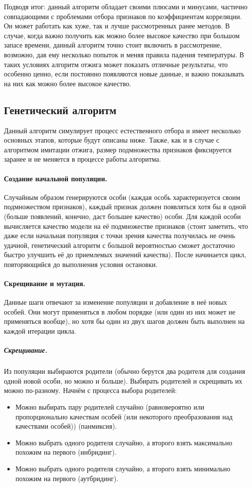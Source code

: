 \documentclass[12pt,fleqn]{article}
\begin{document}
	Подводя итог: данный алгоритм обладает своими плюсами и минусами, частично совпадающими с проблемами отбора признаков по коэффициентам корреляции. Он может работать как хуже, так и лучше рассмотренных ранее методов. В случае, когда важно получить как можно более высокое качество при большом запасе времени, данный алгоритм точно стоит включить в рассмотрение, возможно, дав ему несколько попыток и меняя правила падения температуры. В таких условиях алгоритм отжига может показать отличные результаты, что особенно ценно, если постоянно появляются новые данные, и важно показывать на них как можно более высокое качество.

	\subsection{Генетический алгоритм}

	Данный алгоритм симулирует процесс естественного отбора и имеет несколько основных этапов, которые будут описаны ниже. Также, как и в случае с алгоритмом имитации отжига, размер подмножества признаков фиксируется заранее и не меняется в процессе работы алгоритма.

	\paragraph*{Создание начальной популяции.} Случайным образом генерируются особи (каждая особь характеризуется своим подмножеством признаков), каждый признак должен появляться хотя бы в одной (больше появлений, конечно, даст большее качество) особи. Для каждой особи вычисляется качество модели на её подмножестве признаков (стоит заметить, что даже если начальная популяция с точки зрения качества получилась не очень удачной, генетический алгоритм с большой вероятностью сможет достаточно быстро улучшить её до приемлемых значений качества). После начинается цикл, повторяющийся до выполнения условия остановки.

	\paragraph*{Скрещивание и мутация.} Данные шаги отвечают за изменение популяции и добавление в неё новых особей. Они могут применяться в любом порядке (или один из них может не применяться вообще), но хотя бы один из двух шагов должен быть выполнен на каждой итерации цикла.

	\subparagraph*{Скрещивание.} Из популяции выбираются родители (обычно берутся два родителя для создания одной новой особи, но можно и больше). Выбирать родителей и скрещивать их можно по-разному. Начнём с процесса выбора родителей:
	\begin{itemize}
		\item Можно выбирать пару родителей случайно (равновероятно или пропорционально качествам особей (или некоторого преобразования над качествами особей)) (панмиксия).
		\item Можно выбрать одного родителя случайно, а второго взять максимально похожим на первого (инбридинг).
		\item Можно выбрать одного родителя случайно, а второго взять минимально похожим на первого (аутбридинг).
	\end{itemize}
\end{document}
